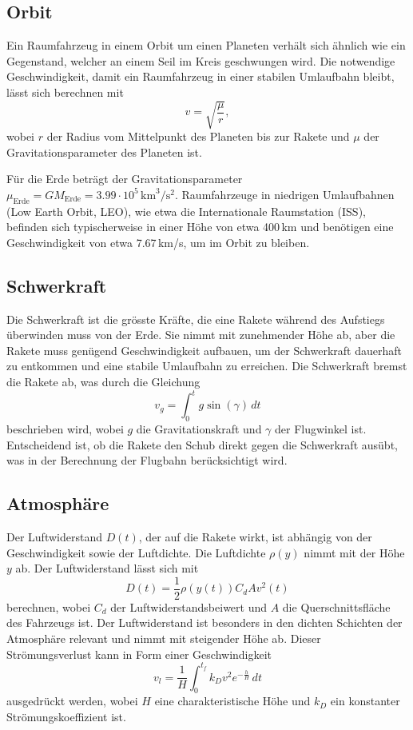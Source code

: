 \subsection{Orbit \label{leo:orbit}}
Ein Raumfahrzeug in einem Orbit um einen Planeten verhält sich ähnlich wie ein Gegenstand, welcher an einem Seil im Kreis geschwungen wird. 
Die notwendige Geschwindigkeit, damit ein Raumfahrzeug in einer stabilen Umlaufbahn bleibt, lässt sich berechnen mit
\[
v = \sqrt{\frac{\mu}{r}},
\]
wobei \(r\) der Radius vom Mittelpunkt des Planeten bis zur Rakete und \(\mu\) der Gravitationsparameter des Planeten ist. 

Für die Erde beträgt der Gravitationsparameter $\mu_{\text{Erde}} = GM_{\text{Erde}} = 3.99 \cdot 10^5\,\text{km}^3/\text{s}^2$. 
Raumfahrzeuge in niedrigen Umlaufbahnen (Low Earth Orbit, LEO), wie etwa die Internationale Raumstation (ISS), befinden sich typischerweise in einer Höhe von etwa 400\,km und benötigen eine Geschwindigkeit von etwa 7.67\,km/s, um im Orbit zu bleiben.

\subsection{Schwerkraft}
Die Schwerkraft ist die grösste Kräfte, die eine Rakete während des Aufstiegs überwinden muss von der Erde. 
Sie nimmt mit zunehmender Höhe ab, aber die Rakete muss genügend Geschwindigkeit aufbauen, um der Schwerkraft dauerhaft zu entkommen und eine stabile Umlaufbahn zu erreichen. 
Die Schwerkraft bremst die Rakete ab, was durch die Gleichung
\[
v_g = \int_0^t g \sin(\gamma) \, dt
\]
beschrieben wird, wobei \(g\) die Gravitationskraft und \(\gamma\) der Flugwinkel ist. 
Entscheidend ist, ob die Rakete den Schub direkt gegen die Schwerkraft ausübt, was in der Berechnung der Flugbahn berücksichtigt wird.

\subsection{Atmosphäre}
Der Luftwiderstand \(D(t)\), der auf die Rakete wirkt, ist abhängig von der Geschwindigkeit sowie der Luftdichte. 
Die Luftdichte \(\rho(y)\) nimmt mit der Höhe \(y\) ab. Der Luftwiderstand lässt sich mit
\[
D(t) = \frac{1}{2} \rho(y(t)) C_d A v^2(t)
\]
berechnen, wobei \(C_d\) der Luftwiderstandsbeiwert und \(A\) die Querschnittsfläche des Fahrzeugs ist. 
Der Luftwiderstand ist besonders in den dichten Schichten der Atmosphäre relevant und nimmt mit steigender Höhe ab. 
Dieser Strömungsverlust kann in Form einer Geschwindigkeit
\[
v_l = \frac{1}{H} \int_0^{t_f} k_D v^2 e^{-\frac{h}{H}} \, dt
\]
ausgedrückt werden, wobei \(H\) eine charakteristische Höhe und \(k_D\) ein konstanter Strömungskoeffizient ist.


